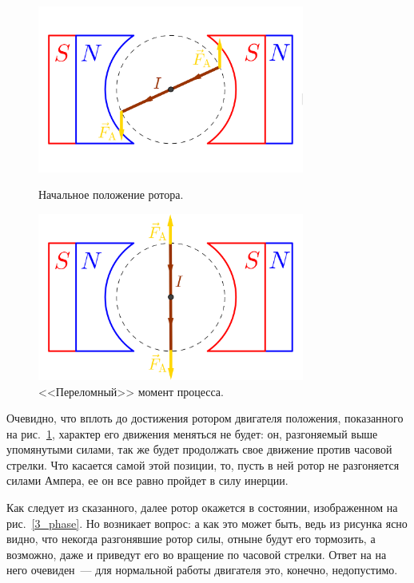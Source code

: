 \documentclass[12pt, a4paper, openany]{extarticle}
\begin{document}
\begin{figure}[h]
	\begin{center}
		\begin{minipage}[h]{0.49\linewidth}
			\centering\includegraphics[height=5.5cm]{pics/phase_1.png}
			\caption{Начальное положение ротора.}
			\label{1_phase} 
		\end{minipage}
		\hfill 
		\begin{minipage}[h]{0.49\linewidth}
			\centering\includegraphics[height=5.5cm]{pics/phase_2.png}
			\caption{<<Переломный>> момент процесса.}
			\label{2_phase}
		\end{minipage}
	\end{center}
\end{figure}

Очевидно, что вплоть до достижения ротором двигателя положения, показанного на рис.~\ref{2_phase}, характер его движения меняться не будет: он, разгоняемый выше упомянутыми силами, так же будет продолжать свое движение против часовой стрелки. 
Что касается самой этой позиции, то, пусть в ней ротор не разгоняется силами Ампера, ее он все равно пройдет в силу инерции. 

Как следует из сказанного, далее ротор окажется в состоянии, изображенном на рис.~\ref{3_phase}. 
Но возникает вопрос: а как это может быть, ведь из рисунка ясно видно, что некогда разгонявшие ротор силы, отныне будут его тормозить, а возможно, даже и приведут его во вращение по часовой стрелки. 
Ответ на на него очевиден~--- для нормальной работы двигателя это, конечно, недопустимо.
\end{document}
